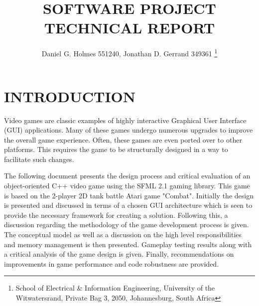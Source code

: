\documentclass[10pt,twocolumn]{witseiepaper}
\begin{document}
\title{SOFTWARE PROJECT TECHNICAL REPORT}

\author{Daniel G. Holmes 551240, Jonathan D. Gerrand 349361
\thanks{School of Electrical \& Information Engineering, University of the
Witwatersrand, Private Bag 3, 2050, Johannesburg, South Africa}
}

% 



\maketitle
\thispagestyle{empty}\pagestyle{empty}


%
\section{INTRODUCTION}%
Video games are classic examples of highly interactive Graphical User Interface (GUI) applications. Many of these games undergo numerous upgrades to improve the overall game experience. Often, these games are even ported over to other platforms. This requires the game to be structurally designed in a way to facilitate such changes. 

The following document presents the design process and critical evaluation of an object-oriented C++ video game using the SFML 2.1 gaming library. This game is based on the 2-player 2D tank battle Atari game "Combat". Initially the design is presented and discussed in terms of a chosen GUI architecture which is seen to provide the necessary framework for creating a solution. Following this, a discussion regarding the methodology of the game development process is given. The conceptual model as well as a discussion on the high level responsibilities and memory management is then presented. Gameplay testing results along with a critical analysis of the game design is given. Finally, recommendations on improvements in game performance and code robustness are provided.
\end{document}

